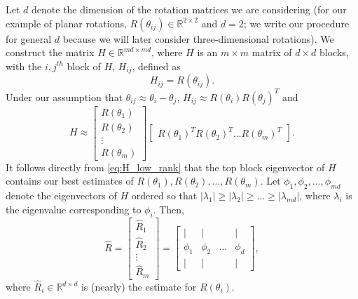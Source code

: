 \documentclass{pnastwo}
\begin{document}
\begin{article}
Let $d$ denote the dimension of the rotation matrices we are considering (for our example of planar rotations, $R(\theta_{ij}) \in \mathbb{R}^{2 \times 2}$ and $d=2$; we write our procedure for general $d$ because we will later consider three-dimensional rotations).
%
We construct the matrix $H \in \mathbb{R}^{md \times md}$, where $H$ is an $m \times m$ matrix of $d \times d$ blocks, with the $i,j^{th}$ block of $H$, $H_{ij}$, defined as
\begin{equation} \label{eq:H_to_R}
H_{ij} = R(\theta_{ij}).
\end{equation}
%
%
Under our assumption that $\theta_{ij} \approx \theta_i - \theta_j$, $H_{ij} \approx R(\theta_i) R(\theta_j)^T$
 and
\begin{equation} \label{eq:H_low_rank}
	H \approx
	\begin{bmatrix}
	R(\theta_1) \\
	R(\theta_2) \\
	\vdots \\
	R(\theta_m)
	\end{bmatrix}
	\begin{bmatrix}
	R(\theta_1)^T R(\theta_2)^T \dots R(\theta_m)^T
	\end{bmatrix}.
\end{equation}
%
It follows directly from \eqref{eq:H_low_rank} that the top block eigenvector of $H$ contains our best estimates of $R(\theta_1), R(\theta_2), \dots, R(\theta_m)$.
%
Let $\phi_1, \phi_2, \dots, \phi_{md}$ denote the eigenvectors of $H$ ordered so that $|\lambda_1| \ge |\lambda_2| \ge \dots \ge |\lambda_{md}|$, where $\lambda_i$ is the eigenvalue corresponding to $\phi_i$.
%
Then,
\begin{equation} \label{eq:R_hat}
\hat{R} =
\begin{bmatrix}
\hat{R}_1 \\
\hat{R}_2 \\
\vdots \\
\hat{R}_m
\end{bmatrix} =
\begin{bmatrix}
| & | & & | \\
\phi_1 & \phi_2 & \dots & \phi_d \\
| & | & & |
\end{bmatrix},
\end{equation}
where $\hat{R}_i \in \mathbb{R}^{d \times d}$ is (nearly) the estimate for $R(\theta_i)$.

\end{article}
\end{document}
